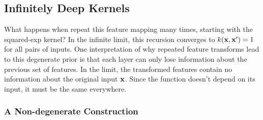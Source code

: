 \documentclass[twoside]{article}
\begin{document}
\subsection{Infinitely Deep Kernels}
What happens when repeat this feature mapping many times, starting with the squared-exp kernel?  In the infinite limit, this recursion converges to $k({\bf{x}},{\bf{x}}') = 1$ for all pairs of inputs.  
%
One interpretation of why repeated feature transforms lead to this degenerate prior is that each layer can only lose information about the previous set of features.  
In the limit, the transformed features contain no information about the original input ${\bf{x}}$.  Since the function doesn't depend on its input, it must be the same everywhere.

\subsubsection{A Non-degenerate Construction}
\end{document}
